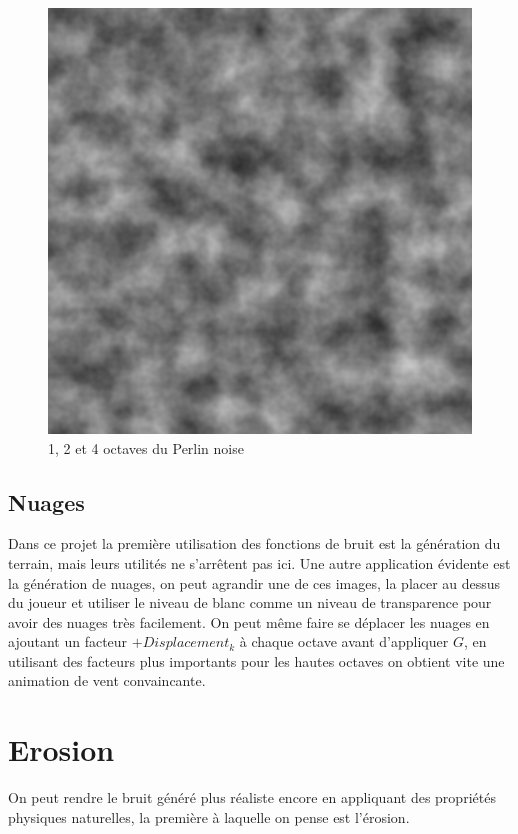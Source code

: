 \documentclass{EPUProjetDi}
\begin{document}
\begin{figure}[ht]
	\includegraphics[scale=.3]{perlin_4_octaves}
	\caption{1, 2 et 4 octaves du Perlin noise}
	\label{fig:layered_noise}
\end{figure}

\subsection{Nuages}
Dans ce projet la première utilisation des fonctions de bruit est la génération du terrain, mais leurs utilités ne s'arrêtent pas ici. Une autre application évidente est la génération de nuages, on peut agrandir une de ces images, la placer au dessus du joueur et utiliser le niveau de blanc comme un niveau de transparence pour avoir des nuages très facilement. On peut même faire se déplacer les nuages en ajoutant un facteur $+Displacement_{k}$ à chaque octave avant d'appliquer $G$, en utilisant des facteurs plus importants pour les hautes octaves on obtient vite une animation de vent convaincante.

\section{Erosion}

On peut rendre le bruit généré plus réaliste encore en appliquant des propriétés physiques naturelles, la première à laquelle on pense est l'érosion.
\end{document}
